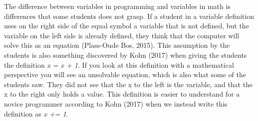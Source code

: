 The difference between variables in programming and variables in math is differences that some students does not grasp. If a student in a variable definition uses on the right side of the equal symbol a variable that is not defined, but the variable on the left side is already defined, they think that the computer will solve this as an equation (Plass-Oude Bos, 2015). This assumption by the students is also something discovered by Kohn (2017) when giving the students the definition \emph{x = x + 1}. If you look at this definition with a mathematical perspective you will see an unsolvable equation, which is also what some of the students saw. They did not see that the x to the left is the variable, and that the x to the right only holds a value. This definition is  easier to understand for a novice programmer according to Kohn (2017) when we instead write this definition as \emph{x += 1}. 


